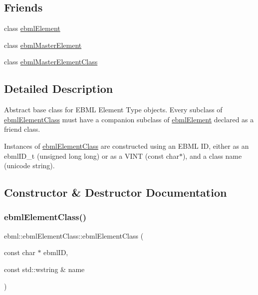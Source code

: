\subsection*{Friends}
\begin{DoxyCompactItemize}
\item 
class \mbox{\hyperlink{classebml_1_1ebmlElementClass_ab57be41c560fe3aac8d5eb6b138c09a5}{ebml\+Element}}
\item 
class \mbox{\hyperlink{classebml_1_1ebmlElementClass_ad88e86cba72e9332a4693c1c6009b281}{ebml\+Master\+Element}}
\item 
class \mbox{\hyperlink{classebml_1_1ebmlElementClass_aa005a2a7ef20ef779d383e3da2e0b46d}{ebml\+Master\+Element\+Class}}
\end{DoxyCompactItemize}


\subsection{Detailed Description}
Abstract base class for E\+B\+ML Element Type objects. Every subclass of \mbox{\hyperlink{classebml_1_1ebmlElementClass}{ebml\+Element\+Class}} must have a companion subclass of \mbox{\hyperlink{classebml_1_1ebmlElement}{ebml\+Element}} declared as a friend class.

Instances of \mbox{\hyperlink{classebml_1_1ebmlElementClass}{ebml\+Element\+Class}} are constructed using an E\+B\+ML ID, either as an ebml\+I\+D\+\_\+t (unsigned long long) or as a V\+I\+NT (const char$\ast$), and a class name (unicode string). 

\subsection{Constructor \& Destructor Documentation}
\mbox{\label{classebml_1_1ebmlElementClass_a6c2081870c5d66c70e0cf988ff253420}} 
\subsubsection{\texorpdfstring{ebml\+Element\+Class()}{ebmlElementClass()}\hspace{0.1cm}{\footnotesize\ttfamily [1/2]}}
{\footnotesize\ttfamily ebml\+::ebml\+Element\+Class\+::ebml\+Element\+Class (\begin{DoxyParamCaption}\item[{const char $\ast$}]{ebml\+ID,  }\item[{const std\+::wstring \&}]{name }\end{DoxyParamCaption})}

